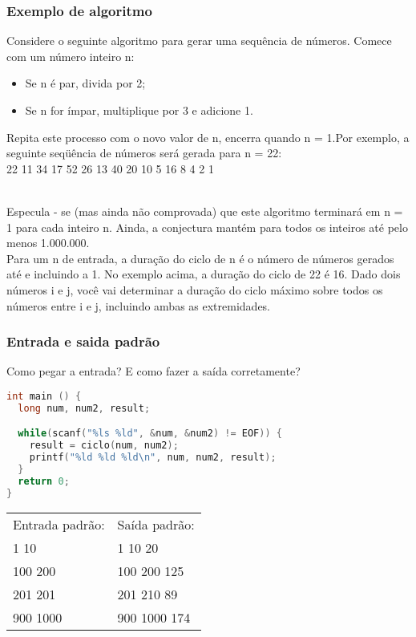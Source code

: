 \begin{frame}
  \frametitle{Exemplo de algoritmo}
  \footnotesize Considere o seguinte algoritmo para gerar uma sequência de números. Comece com um número inteiro n:
  \begin{itemize}
   \item \footnotesize Se n é par, divida por 2;
   \item \footnotesize Se n for ímpar, multiplique por 3 e adicione 1.
  \end{itemize}
  \footnotesize Repita este processo com o novo valor de n, encerra quando n = 1.Por exemplo, a seguinte seqüência de números será gerada para n = 22:\\
  \footnotesize 22 11 34 17 52 26 13 40 20 10 5 16 8 4 2 1\\
  
  \

  \footnotesize Especula - se (mas ainda não comprovada) que este algoritmo terminará em n = 1 para cada inteiro n. Ainda, a conjectura mantém para todos os inteiros até pelo menos 1.000.000.\\
  \footnotesize Para um n de entrada, a duração do ciclo de n é o número de números gerados até e incluindo a 1. No exemplo acima, a duração do ciclo de 22 é 16. Dado dois números i e j, você vai determinar a duração do ciclo máximo sobre todos os números entre i e j, incluindo ambas as extremidades.
\end{frame}

\begin{frame}[fragile]
  \frametitle{Entrada e saida padrão}
  Como pegar a entrada? E como fazer a saída corretamente?
  \begin{lstlisting}[language=c]
int main () {
  long num, num2, result;

  while(scanf("%ls %ld", &num, &num2) != EOF)) {
    result = ciclo(num, num2);
    printf("%ld %ld %ld\n", num, num2, result); 
  }
  return 0;
}
  \end{lstlisting}
  \begin{tabular}{ll}\\
    Entrada padrão: &Saída padrão:\\
    1 10 &1 10 20\\
    100 200 &100 200 125\\
    201 201 &201 210 89\\
    900 1000 &900 1000 174\\	
  \end{tabular}
\end{frame}